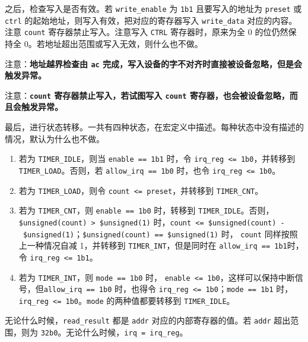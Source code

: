 \documentclass[12pt,AutoFakeBold,AutoFakeSlant]{article}
\providecommand{\tightlist}{%
  \setlength{\itemsep}{0pt}\setlength{\parskip}{0pt}}
\begin{document}
之后，检查写入是否有效。若 \texttt{write\_enable} 为
\texttt{1\textquotesingle{}b1} 且要写入的地址为 \texttt{preset} 或
\texttt{ctrl} 的起始地址，则写入有效，把对应的寄存器写入
\texttt{write\_data} 对应的内容。注意 \texttt{count}
寄存器禁止写入。注意写入 \texttt{CTRL} 寄存器时，原来为全 0
的位仍然保持全 0。若地址超出范围或写入无效，则什么也不做。

注意：\textbf{地址越界检查由 \texttt{ac}
完成，写入设备的字不对齐时直接被设备忽略，但是会触发异常。}

注意：\textbf{\texttt{count} 寄存器禁止写入，若试图写入 \texttt{count}
寄存器，也会被设备忽略，而且会触发异常。}

最后，进行状态转移。一共有四种状态，在宏定义中描述。每种状态中没有描述的情况，默认为什么也不做。

\begin{enumerate}
\def\labelenumi{\arabic{enumi}.}
\tightlist
\item
  若为 \texttt{TIMER\_IDLE}，则当
  \texttt{enable\ ==\ 1\textquotesingle{}b1} 时，令
  \texttt{irq\_reg\ \textless{}=\ 1\textquotesingle{}b0}，并转移到
  \texttt{TIMER\_LOAD}。否则，若
  \texttt{allow\_irq\ ==\ 1\textquotesingle{}b0} 时，也令
  \texttt{irq\_reg\ \textless{}=\ 1\textquotesingle{}b0}。
\item
  若为 \texttt{TIMER\_LOAD}，则令
  \texttt{count\ \textless{}=\ preset}，并转移到 \texttt{TIMER\_CNT}。
\item
  若为 \texttt{TIMER\_CNT}，则
  \texttt{enable\ ==\ 1\textquotesingle{}b0} 时，转移到
  \texttt{TIMER\_IDLE}。否则，\texttt{\$unsigned(count)\ \textgreater{}\ \$unsigned(1)}
  时，\texttt{count\ \textless{}=\ \$unsigned(count)\ -\ \$unsigned(1)}；\texttt{\$unsigned(count)\ ==\ \$unsigned(1)}
  时， \texttt{count} 同样按照上一种情况自减 1，并转移到
  \texttt{TIMER\_INT}，但是同时在
  \texttt{allow\_irq\ ==\ 1\textquotesingle{}b1}时，令
  \texttt{irq\_reg\ \textless{}=\ 1\textquotesingle{}b1}。
\item
  若为 \texttt{TIMER\_INT}，则 \texttt{mode\ ==\ 1\textquotesingle{}b0}
  时，
  \texttt{enable\ \textless{}=\ 1\textquotesingle{}b0}，这样可以保持中断信号，但\texttt{allow\_irq\ ==\ 1\textquotesingle{}b0}
  时，也得令
  \texttt{irq\_reg\ \textless{}=\ 1\textquotesingle{}b0}；\texttt{mode\ ==\ 1\textquotesingle{}b1}
  时，\texttt{irq\_reg\ \textless{}=\ 1\textquotesingle{}b0}。\texttt{mode}
  的两种值都要转移到 \texttt{TIMER\_IDLE}。
\end{enumerate}

无论什么时候，\texttt{read\_result} 都是 \texttt{addr}
对应的内部寄存器的值。若 \texttt{addr} 超出范围，则为
\texttt{32\textquotesingle{}b0}。无论什么时候，\texttt{irq\ =\ irq\_reg}。
\end{document}
